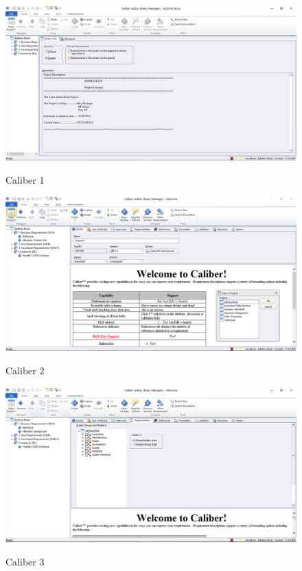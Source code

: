 \FloatBarrier
\begin{figure}[!htpd]
		\centering
		\caption{Caliber 1}
		\includegraphics[scale=0.4]{figuras/caliber_1}
		\label{img:SAF}
\end{figure}
\FloatBarrier

\FloatBarrier
\begin{figure}[!htpd]
		\centering
		\caption{Caliber 2}
		\includegraphics[scale=0.5]{figuras/caliber_2}
		\label{img:SAF}
\end{figure}
\FloatBarrier

\FloatBarrier
\begin{figure}[!htpd]
		\centering
		\caption{Caliber 3}
		\includegraphics[scale=0.4]{figuras/caliber_3}
		\label{img:SAF}
\end{figure}
\FloatBarrier


